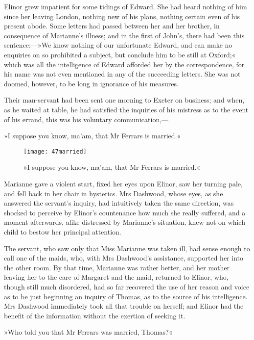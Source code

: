 Elinor grew impatient for some tidings of Edward. She had heard nothing of him since her leaving London, nothing new of his plans, nothing certain even of his present abode. Some letters had passed between her and her brother, in consequence of Marianne’s illness; and in the first of John’s, there had been this sentence:—»We know nothing of our unfortunate Edward, and can make no enquiries on so prohibited a subject, but conclude him to be still at Oxford;« which was all the intelligence of Edward afforded her by the correspondence, for his name was not even mentioned in any of the succeeding letters. She was not doomed, however, to be long in ignorance of his measures.

Their man-servant had been sent one morning to Exeter on business; and when, as he waited at table, he had satisfied the inquiries of his mistress as to the event of his errand, this was his voluntary communication,—

»I suppose you know, ma’am, that Mr Ferrars is married.«

\begin{figure}[tbph]
\centering
\texttt{[image: 47married]}
\caption{»I suppose you know, ma’am, that Mr Ferrars is married.«}
\end{figure}

Marianne gave a violent start, fixed her eyes upon Elinor, saw her turning pale, and fell back in her chair in hysterics. Mrs Dashwood, whose eyes, as she answered the servant’s inquiry, had intuitively taken the same direction, was shocked to perceive by Elinor’s countenance how much she really suffered, and a moment afterwards, alike distressed by Marianne’s situation, knew not on which child to bestow her principal attention.

The servant, who saw only that Miss Marianne was taken ill, had sense enough to call one of the maids, who, with Mrs Dashwood’s assistance, supported her into the other room. By that time, Marianne was rather better, and her mother leaving her to the care of Margaret and the maid, returned to Elinor, who, though still much disordered, had so far recovered the use of her reason and voice as to be just beginning an inquiry of Thomas, as to the source of his intelligence. Mrs Dashwood immediately took all that trouble on herself; and Elinor had the benefit of the information without the exertion of seeking it.

»Who told you that Mr Ferrars was married, Thomas?«

